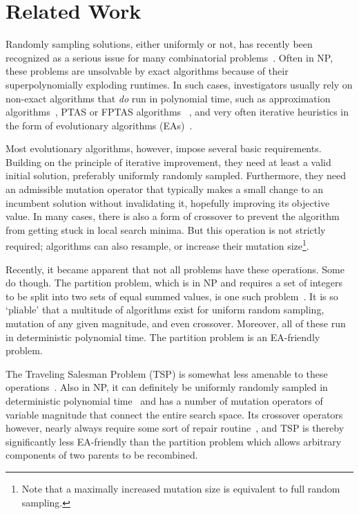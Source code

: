 \documentclass[svgnames,table,runningheads]{llncs}
\begin{document}
\section{Related Work}
\label{sec:relatedwork}

Randomly sampling solutions, either uniformly or not, has recently been recognized as a serious issue for many combinatorial problems~\cite{maaranen2007initial}. Often in NP, these problems are unsolvable by exact algorithms because of their superpolynomially exploding runtimes. In such cases, investigators usually rely on non-exact algorithms that \textit{do} run in polynomial time, such as approximation algorithms~\cite{williamson2011design}, PTAS or FPTAS algorithms ~\cite{schuurman2001approximation}, and very often iterative heuristics in the form of evolutionary algorithms (EAs)~\cite{eiben2003introduction}.

Most evolutionary algorithms, however, impose several basic requirements. Building on the principle of iterative improvement, they need at least a valid initial solution, preferably uniformly randomly sampled. Furthermore, they need an admissible mutation operator that typically makes a small change to an incumbent solution without invalidating it, hopefully improving its objective value. In many cases, there is also a form of crossover to prevent the algorithm from getting stuck in local search minima. But this operation is not strictly required; algorithms can also resample, or increase their mutation size\footnote{Note that a maximally increased mutation size is equivalent to full random sampling.}.

Recently, it became apparent that not all problems have these operations. Some do though. The partition problem, which is in NP and requires a set of integers to be split into two sets of equal summed values, is one such problem~\cite{salas2025beyond,horn2024separating,sazhinov2023partition}. It is so `pliable' that a multitude of algorithms exist for uniform random sampling, mutation of any given magnitude, and even crossover. Moreover, all of these run in deterministic polynomial time. The partition problem is an EA-friendly problem.


The Traveling Salesman Problem (TSP) is somewhat less amenable to these operations~\cite{applegate2011traveling}. Also in NP, it can definitely be uniformly randomly sampled in deterministic polynomial time~\cite{hassel2026traveling} and has a number of mutation operators of variable magnitude that connect the entire search space. Its crossover operators however, nearly always require some sort of repair routine~\cite{dou2023comparative}, and TSP is thereby significantly less EA-friendly than the partition problem which allows arbitrary components of two parents to be recombined.
\end{document}
